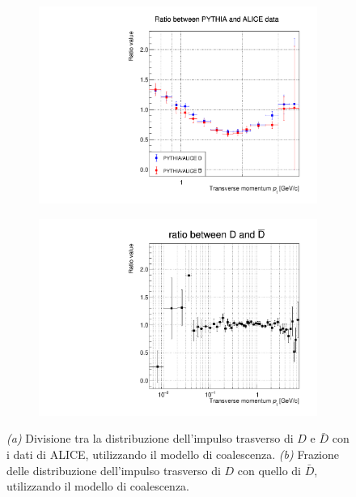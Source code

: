 \begin{figure}[htbp]
    \centering
    \begin{subfigure}{.49\textwidth}
    \centering
        \includegraphics[width=\textwidth]{image/3-risultati/analyse/E/division.pdf}
        \caption{}
        \label{fig:E_division}
    \end{subfigure}
    \begin{subfigure}{.49\textwidth}
        \centering
        \includegraphics[width=\textwidth]{image/3-risultati/analyse/E/ratio_DD.pdf}
        \caption{}
        \label{fig:E_ratio_DD}
    \end{subfigure}
    \caption{\emph{\rmfamily (a)} Divisione tra la distribuzione dell'impulso trasverso di $D$ e $\bar D$ con i dati di ALICE, utilizzando il modello di coalescenza. \emph{\rmfamily (b)} Frazione delle distribuzione dell'impulso trasverso di $D$ con quello di $\bar D$, utilizzando il modello di coalescenza.}
    \label{fig:E_ratio_DD_}
\end{figure}
